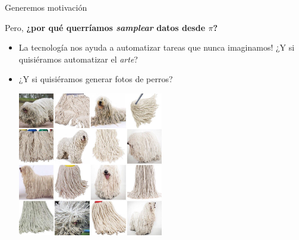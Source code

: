 \documentclass[aspectratio=169,xcolor=dvipsnames, t, spanish]{beamer}
\begin{document}
\begin{frame}{Generemos motivación}
\begin{center}
    Pero, \textbf{¿por qué querríamos \textit{samplear} datos desde $\pi$?}
\end{center}
\begin{itemize}
        \item La tecnología nos ayuda a automatizar tareas que nunca imaginamos! ¿Y si quisiéramos automatizar el \textit{arte}?
        \pause

        \item ¿Y si quisiéramos generar fotos de perros?\vspace{2mm}\pause
        \begin{center}
            \includegraphics[width=0.5\textwidth,trim={0cm 12.5cm 0cm 0cm},clip]{figures/PerrosMopas.jpg}
        \end{center}
    \end{itemize}
\end{frame}

\end{document}
